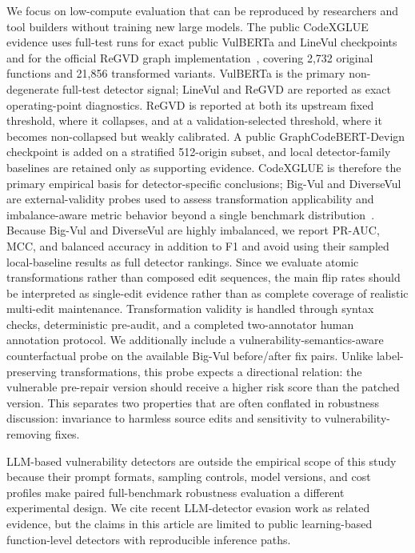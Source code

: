 \documentclass[a4paper,fleqn]{cas-dc}
\begin{document}
We focus on low-compute evaluation that can be reproduced by researchers and
tool builders without training new large models. The public CodeXGLUE evidence
uses full-test runs for exact public VulBERTa and LineVul
checkpoints~\cite{lu2021codexglue,zhou2019devign,hanif2022vulberta,fu2022linevul}
and for the official ReGVD graph implementation~\cite{nguyen2022regvd},
covering 2,732 original functions and 21,856 transformed variants. VulBERTa
is the primary non-degenerate full-test detector signal; LineVul and ReGVD are
reported as exact operating-point diagnostics. ReGVD is
reported at both its upstream fixed threshold, where it collapses, and at a
validation-selected threshold, where it becomes non-collapsed but weakly
calibrated. A public GraphCodeBERT-Devign checkpoint is added on a stratified
512-origin subset, and local detector-family baselines are retained only as
supporting evidence. CodeXGLUE is therefore the primary empirical basis for
detector-specific conclusions; Big-Vul and DiverseVul are external-validity
probes used to assess transformation applicability and imbalance-aware metric
behavior beyond a single benchmark
distribution~\cite{fan2020bigvul,chen2023diversevul}. Because Big-Vul and
DiverseVul are highly imbalanced, we report PR-AUC, MCC, and balanced accuracy
in addition to F1 and avoid using their sampled local-baseline results as full
detector rankings. Since we evaluate atomic transformations rather than
composed edit sequences, the main flip rates should be interpreted as
single-edit evidence rather than as complete coverage of realistic multi-edit
maintenance.
Transformation validity is handled through syntax checks, deterministic
pre-audit, and a completed two-annotator human annotation protocol.
We additionally include a vulnerability-semantics-aware counterfactual probe on
the available Big-Vul before/after fix pairs. Unlike label-preserving
transformations, this probe expects a directional relation: the vulnerable
pre-repair version should receive a higher risk score than the patched version.
This separates two properties that are often conflated in robustness
discussion: invariance to harmless source edits and sensitivity to
vulnerability-removing fixes.

LLM-based vulnerability detectors are outside the empirical scope of this
study because their prompt formats, sampling controls, model versions, and
cost profiles make paired full-benchmark robustness evaluation a different
experimental design. We cite recent LLM-detector evasion work as related
evidence, but the claims in this article are limited to public learning-based
function-level detectors with reproducible inference paths.
\end{document}
